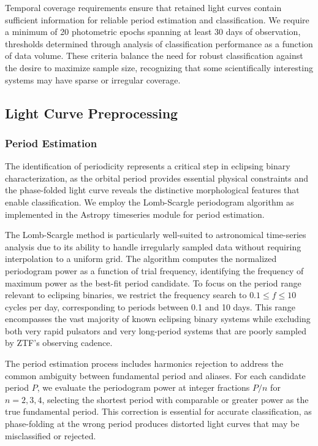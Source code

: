 \documentclass[11pt,a4paper]{article}
\begin{document}
Temporal coverage requirements ensure that retained light curves contain sufficient information for reliable period estimation and classification. We require a minimum of 20 photometric epochs spanning at least 30 days of observation, thresholds determined through analysis of classification performance as a function of data volume. These criteria balance the need for robust classification against the desire to maximize sample size, recognizing that some scientifically interesting systems may have sparse or irregular coverage.

\subsection{Light Curve Preprocessing}

\subsubsection{Period Estimation}

The identification of periodicity represents a critical step in eclipsing binary characterization, as the orbital period provides essential physical constraints and the phase-folded light curve reveals the distinctive morphological features that enable classification. We employ the Lomb-Scargle periodogram algorithm \citep{lomb1976least, scargle1982studies} as implemented in the Astropy timeseries module for period estimation.

The Lomb-Scargle method is particularly well-suited to astronomical time-series analysis due to its ability to handle irregularly sampled data without requiring interpolation to a uniform grid. The algorithm computes the normalized periodogram power as a function of trial frequency, identifying the frequency of maximum power as the best-fit period candidate. To focus on the period range relevant to eclipsing binaries, we restrict the frequency search to $0.1 \leq f \leq 10$ cycles per day, corresponding to periods between 0.1 and 10 days. This range encompasses the vast majority of known eclipsing binary systems while excluding both very rapid pulsators and very long-period systems that are poorly sampled by ZTF's observing cadence.

The period estimation process includes harmonics rejection to address the common ambiguity between fundamental period and aliases. For each candidate period $P$, we evaluate the periodogram power at integer fractions $P/n$ for $n = 2, 3, 4$, selecting the shortest period with comparable or greater power as the true fundamental period. This correction is essential for accurate classification, as phase-folding at the wrong period produces distorted light curves that may be misclassified or rejected.
\end{document}
